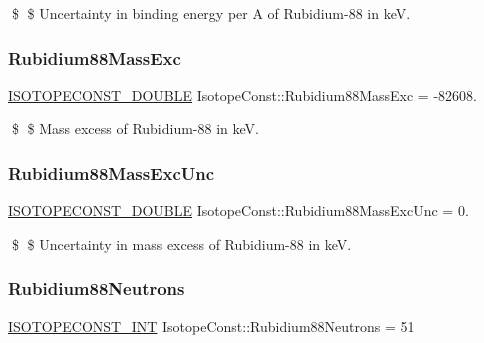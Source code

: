 \$ \$ Uncertainty in binding energy per A of Rubidium-\/88 in keV. \mbox{\label{group___isotope_const-_rubidium-_rb88_ga2205cf4994774142b411859c5a6ce958}} 
\subsubsection{\texorpdfstring{Rubidium88\+Mass\+Exc}{Rubidium88MassExc}}
{\footnotesize\ttfamily \mbox{\hyperlink{group___isotope_const-_macros_ga8f45a7272ce02c0b4c65c44636ed719a}{I\+S\+O\+T\+O\+P\+E\+C\+O\+N\+S\+T\+\_\+\+D\+O\+U\+B\+LE}} Isotope\+Const\+::\+Rubidium88\+Mass\+Exc = -\/82608.}

\$ \$ Mass excess of Rubidium-\/88 in keV. \mbox{\label{group___isotope_const-_rubidium-_rb88_gab5b4daf3ad05211e0a37947fff981137}} 
\subsubsection{\texorpdfstring{Rubidium88\+Mass\+Exc\+Unc}{Rubidium88MassExcUnc}}
{\footnotesize\ttfamily \mbox{\hyperlink{group___isotope_const-_macros_ga8f45a7272ce02c0b4c65c44636ed719a}{I\+S\+O\+T\+O\+P\+E\+C\+O\+N\+S\+T\+\_\+\+D\+O\+U\+B\+LE}} Isotope\+Const\+::\+Rubidium88\+Mass\+Exc\+Unc = 0.}

\$ \$ Uncertainty in mass excess of Rubidium-\/88 in keV. \mbox{\label{group___isotope_const-_rubidium-_rb88_gae39fb9f0225f8bfda69e42bc31b71bb5}} 
\subsubsection{\texorpdfstring{Rubidium88\+Neutrons}{Rubidium88Neutrons}}
{\footnotesize\ttfamily \mbox{\hyperlink{group___isotope_const-_macros_ga5f18360b3e99483a35c32d789e62621c}{I\+S\+O\+T\+O\+P\+E\+C\+O\+N\+S\+T\+\_\+\+I\+NT}} Isotope\+Const\+::\+Rubidium88\+Neutrons = 51}

